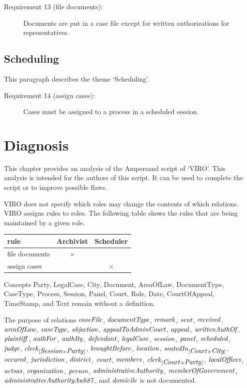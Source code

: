 \documentclass[10pt,a4paper]{report}              %
\theoremstyle{plain}\theorembodyfont{\rmfamily}\newtheorem{definition}{Definition}[section]
\theoremstyle{plain}\theorembodyfont{\rmfamily}\newtheorem{designrule}[definition]{Requirement}
\def\id#1{\mbox{\em #1\/}}
\begin{document}
\begin{description}
\item[Requirement 13 (file documents):]
\label{ReqRule:file documents}
Documents are put in a case file except for written authorizations for
representatives.

\end{description}
\section{Scheduling}

This paragraph describes the theme `Scheduling'.

\begin{description}
\item[Requirement 14 (assign cases):]
\label{ReqRule:assign cases}
Cases must be assigned to a process in a scheduled session.

\end{description}
\chapter{Diagnosis}\label{chpDiagnosis}

This chapter provides an analysis of the Ampersand script of `VIRO'. This analysis is intended for the authors of this script. It can be used to complete the script or to improve possible flaws. 

VIRO does not specify which roles may change the contents of which relations. 
VIRO assigns rules to roles. The following table shows the rules that are being maintained by a given role.

\begin{center}
\begin{tabular}{lcc}
rule & Archivist & Scheduler\\
\hline
file documents & $\times$ & \\
assign cases &  & $\times$\\
\end{tabular}
\end{center}

Concepts Party, LegalCase, City, Document, AreaOfLaw, DocumentType, CaseType, Process, Session, Panel, Court, Role, Date, CourtOfAppeal, TimeStamp, and Text remain without a definition.

The purpose of relations ${\id{caseFile}}$, ${\id{documentType}}$, ${\id{remark}}$, ${\id{sent}}$, ${\id{received}}$, ${\id{areaOfLaw}}$, ${\id{caseType}}$, ${\id{objection}}$, ${\id{appealToAdminCourt}}$, ${\id{appeal}}$, ${\id{writtenAuthOf}}$, ${\id{plaintiff}}$, ${\id{authFor}}$, ${\id{authBy}}$, ${\id{defendant}}$, ${\id{legalCase}}$, ${\id{session}}$, ${\id{panel}}$, ${\id{scheduled}}$, ${\id{judge}}$, ${\id{clerk}}_{[{\id{Session}}{\times}{\id{Party}}]}$, ${\id{broughtBefore}}$, ${\id{location}}$, ${\id{seatedIn}}_{[{\id{Court}}{\times}{\id{City}}]}$, ${\id{occured}}$, ${\id{jurisdiction}}$, ${\id{district}}$, ${\id{court}}$, ${\id{members}}$, ${\id{clerk}}_{[{\id{Court}}{\times}{\id{Party}}]}$, ${\id{localOffices}}$, ${\id{actsas}}$, ${\id{organization}}$, ${\id{person}}$, ${\id{administrativeAuthority}}$, ${\id{memberOfGovernment}}$, ${\id{administrativeAuthorityAwb87}}$, and ${\id{domicile}}$ is not documented.
\end{document}

